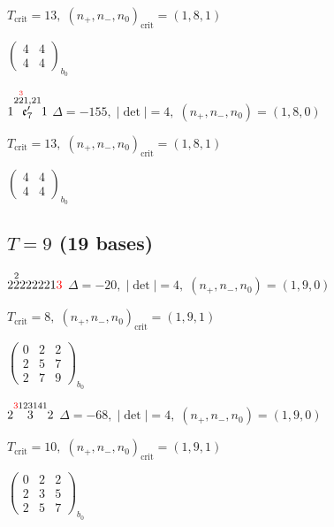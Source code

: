 \documentclass[10pt]{article}
\begin{document}
\hspace{1em}$T_{\text{crit}}=13,\; (n_+,n_-,n_0)_{\text{crit}}=(1,8,1)$

\hspace{2em}$\left(\begin{smallmatrix}4 & 4 \\ 4 & 4\end{smallmatrix}\right)_{\!b_0}$

\smallskip

$1\overset{2\overset{\textcolor{red}{3}}{2}1,21}{\mathfrak{e}_7'}1$ \quad $\Delta=-155,\; |\det|=4,\; (n_+,n_-,n_0)=(1,8,0)$

\hspace{1em}$T_{\text{crit}}=13,\; (n_+,n_-,n_0)_{\text{crit}}=(1,8,1)$

\hspace{2em}$\left(\begin{smallmatrix}4 & 4 \\ 4 & 4\end{smallmatrix}\right)_{\!b_0}$


\subsection*{$T = 9$ \quad (19 bases)}
\smallskip

$2\overset{2}{2}222221\textcolor{red}{3}$ \quad $\Delta=-20,\; |\det|=4,\; (n_+,n_-,n_0)=(1,9,0)$

\hspace{1em}$T_{\text{crit}}=8,\; (n_+,n_-,n_0)_{\text{crit}}=(1,9,1)$

\hspace{2em}$\left(\begin{smallmatrix}0 & 2 & 2 \\ 2 & 5 & 7 \\ 2 & 7 & 9\end{smallmatrix}\right)_{\!b_0}$

\smallskip

$2\overset{\textcolor{red}{3}123141}{3}2$ \quad $\Delta=-68,\; |\det|=4,\; (n_+,n_-,n_0)=(1,9,0)$

\hspace{1em}$T_{\text{crit}}=10,\; (n_+,n_-,n_0)_{\text{crit}}=(1,9,1)$

\hspace{2em}$\left(\begin{smallmatrix}0 & 2 & 2 \\ 2 & 3 & 5 \\ 2 & 5 & 7\end{smallmatrix}\right)_{\!b_0}$
\end{document}
